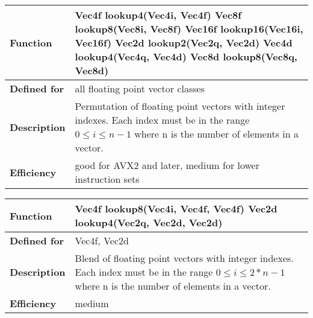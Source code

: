 \documentclass[vcl_manual.tex]{subfiles}
\begin{document}
\begin{tabular}{|p{30mm}|p{120mm}|}
\hline
\bfseries Function & Vec4f lookup4(Vec4i, Vec4f) \newline
Vec8f lookup8(Vec8i, Vec8f) \newline
Vec16f lookup16(Vec16i, Vec16f) \newline
Vec2d lookup2(Vec2q, Vec2d) \newline
Vec4d lookup4(Vec4q, Vec4d) \newline
Vec8d lookup8(Vec8q, Vec8d) \\ \hline
\bfseries Defined for & all floating point vector classes \\ \hline
\bfseries Description & Permutation of floating point vectors with integer indexes. Each index must be in the range  $0 \leq i \leq n-1$ where n is the number of elements in a vector. \\ \hline
\bfseries Efficiency & good for AVX2 and later, medium for lower instruction sets \\ \hline
\end{tabular}


\begin{tabular}{|p{30mm}|p{120mm}|}
\hline
\bfseries Function & Vec4f lookup8(Vec4i, Vec4f, Vec4f) \newline
Vec2d lookup4(Vec2q, Vec2d, Vec2d) \\ \hline
\bfseries Defined for & Vec4f, Vec2d \\ \hline
\bfseries Description & Blend of floating point vectors with integer indexes. Each index must be in the range  $0 \leq i \leq 2*n-1$ where n is the number of elements in a vector. \\ \hline
\bfseries Efficiency & medium \\ \hline
\end{tabular}
\end{document}
